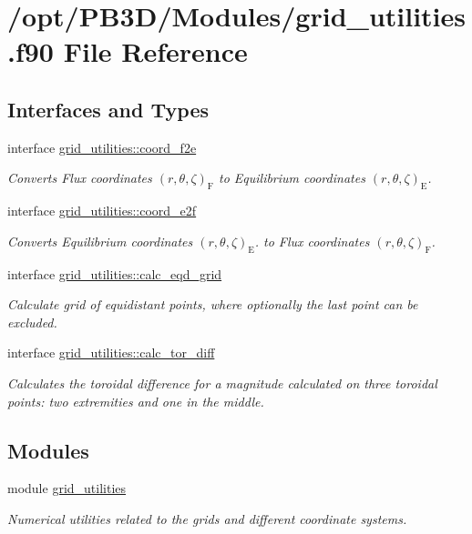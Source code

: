 \hypertarget{grid__utilities_8f90}{}\section{/opt/\+P\+B3\+D/\+Modules/grid\+\_\+utilities.f90 File Reference}
\label{grid__utilities_8f90}
\subsection*{Interfaces and Types}
\begin{DoxyCompactItemize}
\item 
interface \hyperlink{interfacegrid__utilities_1_1coord__f2e}{grid\+\_\+utilities\+::coord\+\_\+f2e}
\begin{DoxyCompactList}\small\item\em Converts Flux coordinates $\left(r,\theta,\zeta\right)_\text{F}$ to Equilibrium coordinates $\left(r,\theta,\zeta\right)_\text{E}$. \end{DoxyCompactList}\item 
interface \hyperlink{interfacegrid__utilities_1_1coord__e2f}{grid\+\_\+utilities\+::coord\+\_\+e2f}
\begin{DoxyCompactList}\small\item\em Converts Equilibrium coordinates $\left(r,\theta,\zeta\right)_\text{E}$. to Flux coordinates $\left(r,\theta,\zeta\right)_\text{F}$. \end{DoxyCompactList}\item 
interface \hyperlink{interfacegrid__utilities_1_1calc__eqd__grid}{grid\+\_\+utilities\+::calc\+\_\+eqd\+\_\+grid}
\begin{DoxyCompactList}\small\item\em Calculate grid of equidistant points, where optionally the last point can be excluded. \end{DoxyCompactList}\item 
interface \hyperlink{interfacegrid__utilities_1_1calc__tor__diff}{grid\+\_\+utilities\+::calc\+\_\+tor\+\_\+diff}
\begin{DoxyCompactList}\small\item\em Calculates the toroidal difference for a magnitude calculated on three toroidal points\+: two extremities and one in the middle. \end{DoxyCompactList}\end{DoxyCompactItemize}
\subsection*{Modules}
\begin{DoxyCompactItemize}
\item 
module \hyperlink{namespacegrid__utilities}{grid\+\_\+utilities}
\begin{DoxyCompactList}\small\item\em Numerical utilities related to the grids and different coordinate systems. \end{DoxyCompactList}\end{DoxyCompactItemize}
